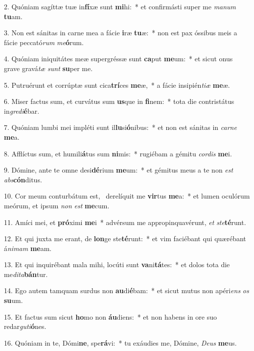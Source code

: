 2. Quóniam sagíttæ tuæ in\textbf{fí}xæ sunt \textbf{mi}hi:~*  et confirmásti super me \textit{ma}\textit{num} \textbf{tu}am.\

3. Non est sánitas in carne mea a fácie \textbf{i}ræ \textbf{tu}æ:~*  non est pax óssibus meis a fácie peccató\textit{rum} \textit{me}\textbf{ó}rum.\

4. Quóniam iniquitátes meæ supergréssæ sunt \textbf{ca}put \textbf{me}um:~*  et sicut onus grave gravá\textit{tæ} \textit{sunt} \textbf{su}per me.\

5. Putruérunt et corrúptæ sunt cica\textbf{trí}ces \textbf{me}æ,~*  a fácie insipién\textit{ti}\textit{æ} \textbf{me}æ.\

6. Miser factus sum, et curvátus sum \textbf{us}que in \textbf{fi}nem:~*  tota die contristátus in\textit{gre}\textit{di}\textbf{é}bar.\

7. Quóniam lumbi mei impléti sunt il\textbf{lu}si\textbf{ó}nibus:~*  et non est sánitas in \textit{car}\textit{ne} \textbf{me}a.\

8. Afflíctus sum, et humili\textbf{á}tus sum \textbf{ni}mis:~*  rugiébam a gémitu \textit{cor}\textit{dis} \textbf{me}i.\

9. Dómine, ante te omne desi\textbf{dé}rium \textbf{me}um:~*  et gémitus meus a te non \textit{est} \textit{abs}\textbf{cón}ditus.\

10. Cor meum conturbátum est, \dag\  derelíquit me \textbf{vir}tus \textbf{me}a:~*  et lumen oculórum meórum, et ipsum \textit{non} \textit{est} \textbf{me}cum.\

11. Amíci mei, et \textbf{pró}ximi \textbf{me}i~*  advérsum me appropinquavérunt, \textit{et} \textit{ste}\textbf{té}runt.\

12. Et qui juxta me erant, de \textbf{lon}ge ste\textbf{té}runt:~*  et vim faciébant qui quærébant á\textit{ni}\textit{mam} \textbf{me}am.\

13. Et qui inquirébant mala mihi, locúti sunt \textbf{va}ni\textbf{tá}tes:~*  et dolos tota die me\textit{di}\textit{ta}\textbf{bán}tur.\

14. Ego autem tamquam surdus non \textbf{au}di\textbf{é}bam:~*  et sicut mutus non apéri\textit{ens} \textit{os} \textbf{su}um.\

15. Et factus sum sicut \textbf{ho}mo non \textbf{áu}diens:~*  et non habens in ore suo redar\textit{gu}\textit{ti}\textbf{ó}nes.\

16. Quóniam in te, Dómi\textbf{ne}, spe\textbf{rá}vi:~*  tu exáudies me, Dómine, \textit{De}\textit{us} \textbf{me}us.\

